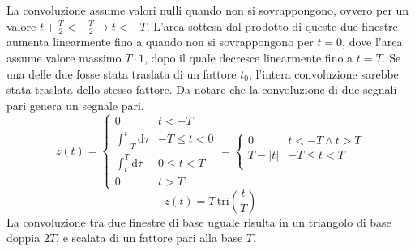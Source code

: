 \documentclass{article}
\newcommand{\df}{\mathrm{d}}
\begin{document}
La convoluzione assume valori nulli quando non si sovrappongono, ovvero per un valore $t+\displaystyle\frac{T}{2}<-\frac{T}{2}\to t<-T$. L'area sottesa dal prodotto 
di queste due finestre aumenta linearmente fino a quando non si sovrappongono per $t=0$, dove l'area assume valore massimo $T\cdot 1$, dopo il quale 
decresce linearmente fino a $t=T$. Se una delle due fosse stata traslata di un fattore $t_0$, l'intera convoluzione sarebbe stata traslata dello stesso fattore. Da notare 
che la convoluzione di due segnali pari genera un segnale pari.  
\begin{equation*}
    z(t)=\begin{cases}
        0&t<-T\\
        \displaystyle\int_{-T}^t\df\tau&-T\leq t<0\\
        \displaystyle\int_t^T\df\tau&0\leq t<T\\
        0&t>T
    \end{cases}=\begin{cases}
        0&t<-T\land t>T\\
        T-|t|&-T\leq t<T\\
    \end{cases}
\end{equation*}
\begin{equation}
    z(t)=T\,\mbox{tri}\left(\displaystyle\frac{t}{T}\right)
\end{equation}
La convoluzione tra due finestre di base uguale risulta in un triangolo di base doppia $2T$, e scalata di un fattore pari alla base $T$. 

\begin{center}
\end{center}
\end{document}
